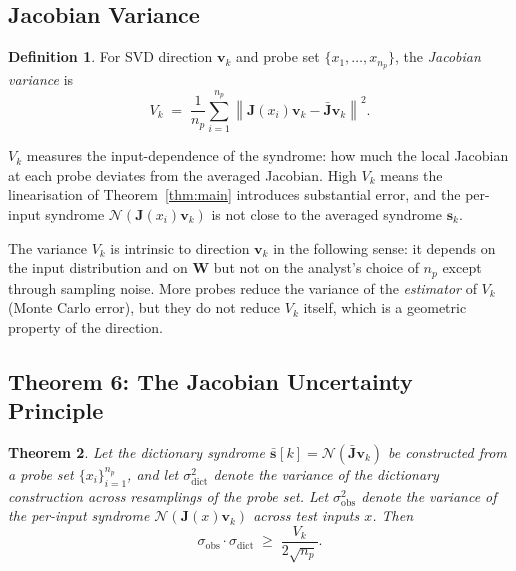 \documentclass[11pt,a4paper]{article}
\newtheorem{theorem}{Theorem}[section]
\theoremstyle{definition}
\newtheorem{definition}[theorem]{Definition}
\newcommand{\Wm}{\mathbf{W}}
\newcommand{\Jm}{\mathbf{J}}
\newcommand{\vk}[1][]{\mathbf{v}_{#1}}
\newcommand{\sk}[1][]{\mathbf{s}_{#1}}
\newcommand{\Nop}{\mathcal{N}}
\newcommand{\norm}[1]{\left\lVert#1\right\rVert}
\begin{document}
\subsection{Jacobian Variance}
\label{sec:jvar}

\begin{defbox}
\begin{definition}
\label{def:jv}
For SVD direction $\vk[k]$ and probe set $\{x_1,\ldots,x_{n_p}\}$, the \emph{Jacobian variance} is
\begin{equation}
  V_k \;=\; \frac{1}{n_p}\sum_{i=1}^{n_p}
          \norm{\Jm(x_i)\vk[k] - \bar{\Jm}\vk[k]}^2 .
  \label{eq:jvar}
\end{equation}
\end{definition}
\end{defbox}

$V_k$ measures the input-dependence of the syndrome: how much the local Jacobian at each probe deviates from the averaged Jacobian. High $V_k$ means the linearisation of Theorem~\ref{thm:main} introduces substantial error, and the per-input syndrome $\Nop(\Jm(x_i)\vk[k])$ is not close to the averaged syndrome $\sk[k]$.

The variance $V_k$ is intrinsic to direction $\vk[k]$ in the following sense: it depends on the input distribution and on $\Wm$ but not on the analyst's choice of $n_p$ except through sampling noise. More probes reduce the variance of the \emph{estimator} of $V_k$ (Monte Carlo error), but they do not reduce $V_k$ itself, which is a geometric property of the direction.

\subsection{Theorem 6: The Jacobian Uncertainty Principle}
\label{sec:jup}

\begin{thmbox}
\begin{theorem}
\label{thm:jup}
Let the dictionary syndrome $\bar{\sk}[k] = \Nop(\bar{\Jm}\vk[k])$ be constructed from a probe set $\{x_i\}_{i=1}^{n_p}$, and let $\sigma_{\mathrm{dict}}^2$ denote the variance of the dictionary construction across resamplings of the probe set. Let $\sigma_{\mathrm{obs}}^2$ denote the variance of the per-input syndrome $\Nop(\Jm(x)\vk[k])$ across test inputs $x$. Then
\begin{equation}
  \sigma_{\mathrm{obs}}\cdot \sigma_{\mathrm{dict}}
  \;\geq\; \frac{V_k}{2\sqrt{n_p}}.
  \label{eq:jup}
\end{equation}
\end{theorem}
\end{thmbox}
\end{document}

